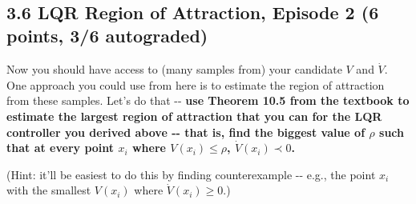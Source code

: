 \documentclass[11pt]{article}
\begin{document}
    \begin{center}
    \end{center}
    { \hspace*{\fill} \\}
    
    \subsection{3.6 LQR Region of Attraction, Episode 2 (6 points, 3/6
autograded)}\label{lqr-region-of-attraction-episode-2-6-points-36-autograded}

Now you should have access to (many samples from) your candidate \(V\)
and \(\dot{V}\). One approach you could use from here is to estimate the
region of attraction from these samples. Let's do that -\/- \textbf{use
Theorem 10.5 from the textbook to estimate the largest region of
attraction that you can for the LQR controller you derived above -\/-
that is, find the biggest value of \(\rho\) such that at every point
\(x_i\) where \(V(x_i) \leq \rho\), \(\dot{V}(x_i) \prec 0\).}

(Hint: it'll be easiest to do this by finding counterexample -\/- e.g.,
the point \(x_i\) with the smallest \(V(x_i)\) where
\(\dot{V}(x_i) \geq 0\).)
\end{document}

